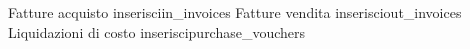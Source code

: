 \documentclass[a4paper]{article}
\newcommand{\SRE}{inserisci}
\begin{document}
\setlength{\parindent}{0cm}
\begin{centering}
\tabulinesep=1.5mm
\large{Fatture acquisto}
\normalsize{\SRE{in_invoices}}
\large{Fatture vendita}
\normalsize{\SRE{out_invoices}}
\large{Liquidazioni di costo}
\normalsize{\SRE{purchase_vouchers}}
\end {centering}
\end{document}
